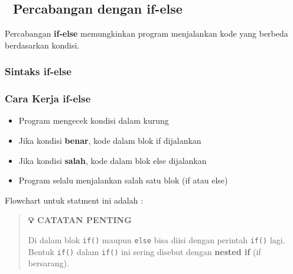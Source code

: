 \subsection{🔄 Percabangan dengan if-else}\label{percabangan-dengan-if-..-else}

Percabangan \textbf{if-else} memungkinkan program menjalankan kode yang berbeda berdasarkan kondisi.

\subsubsection{Sintaks if-else}



\subsubsection{Cara Kerja if-else}

\begin{itemize}
\item Program mengecek kondisi dalam kurung
\item Jika kondisi \textbf{benar}, kode dalam blok if dijalankan
\item Jika kondisi \textbf{salah}, kode dalam blok else dijalankan
\item Program selalu menjalankan salah satu blok (if atau else)
\end{itemize}

Flowchart untuk statment ini adalah :

\begin{quotation}
{\LARGE {}} \textbf{💡 CATATAN PENTING}

Di dalam blok \texttt{if()} maupun \texttt{else} bisa diisi dengan perintah \texttt{if()} lagi. Bentuk \texttt{if()} dalam \texttt{if()} ini sering disebut dengan \textbf{nested if} (if bersarang).
\end{quotation}


